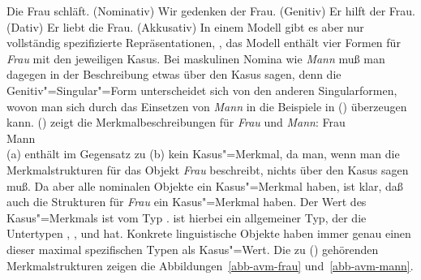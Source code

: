 \eal\jamwidth=6cm\relax
\ex Die Frau schläft.       \jam(Nominativ)
\ex Wir gedenken der Frau.  \jam(Genitiv)
\ex Er hilft der Frau.      \jam(Dativ)
\ex Er liebt die Frau.      \jam(Akkusativ)
\zl
In einem Modell gibt es aber nur vollständig spezifizierte Repräsentationen,
\dash, das Modell enthält vier Formen für \emph{Frau} mit den jeweiligen Kasus.
Bei maskulinen Nomina wie \emph{Mann} muß man dagegen in der Beschreibung
etwas über den Kasus sagen, denn die Genitiv"=Singular"=Form unterscheidet
sich von den anderen Singularformen, wovon man sich durch das Einsetzen
von \emph{Mann} in die Beispiele in () überzeugen kann. () zeigt die
Merkmalbeschreibungen für \emph{Frau} und \emph{Mann}:
\eal
\ex\label{avm-frau}
Frau\\
\ex\label{avm-mann}
Mann\\
\zl
(a) enthält im Gegensatz zu (b) kein Kasus"=Merkmal, da man, wenn man die
Merkmalstrukturen für das Objekt \emph{Frau} beschreibt, nichts über den Kasus sagen muß. Da aber
alle nominalen Objekte ein Kasus"=Merkmal haben, ist klar, daß auch die Strukturen für \emph{Frau}
ein Kasus"=Merkmal haben. Der Wert des Kasus"=Merkmals ist vom Typ .
 ist hierbei ein allgemeiner Typ, der die Untertypen , ,
 und  hat. Konkrete linguistische Objekte haben immer genau einen dieser
maximal spezifischen Typen als Kasus"=Wert. Die zu () gehörenden Merkmalstrukturen zeigen die
Abbildungen~\ref{abb-avm-frau} und~\ref{abb-avm-mann}.%
